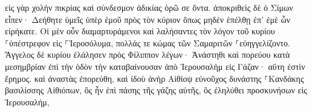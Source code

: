 \documentclass{openreader}
\begin{document}
εἰς γὰρ χολὴν πικρίας καὶ σύνδεσμον ἀδικίας ὁρῶ σε ὄντα. 
ἀποκριθεὶς δὲ ὁ Σίμων εἶπεν· Δεήθητε ὑμεῖς ὑπὲρ ἐμοῦ πρὸς τὸν κύριον ὅπως μηδὲν ἐπέλθῃ ἐπ’ ἐμὲ ὧν εἰρήκατε. 
Οἱ μὲν οὖν διαμαρτυράμενοι καὶ λαλήσαντες τὸν λόγον τοῦ κυρίου ⸀ὑπέστρεφον εἰς ⸀Ἱεροσόλυμα, πολλάς τε κώμας τῶν Σαμαριτῶν ⸀εὐηγγελίζοντο. 
Ἄγγελος δὲ κυρίου ἐλάλησεν πρὸς Φίλιππον λέγων· Ἀνάστηθι καὶ πορεύου κατὰ μεσημβρίαν ἐπὶ τὴν ὁδὸν τὴν καταβαίνουσαν ἀπὸ Ἰερουσαλὴμ εἰς Γάζαν· αὕτη ἐστὶν ἔρημος. 
καὶ ἀναστὰς ἐπορεύθη, καὶ ἰδοὺ ἀνὴρ Αἰθίοψ εὐνοῦχος δυνάστης ⸀Κανδάκης βασιλίσσης Αἰθιόπων, ὃς ἦν ἐπὶ πάσης τῆς γάζης αὐτῆς, ὃς ἐληλύθει προσκυνήσων εἰς Ἰερουσαλήμ, 
\end{document}
